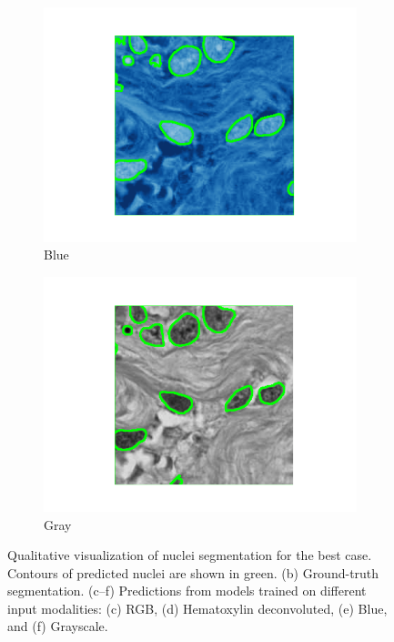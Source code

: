 \documentclass[target=bach,aauheader=,style=]{thud}
\begin{document}
\begin{figure}[!htbp]
\begin{subfigure}{0.48\textwidth}
  \centering
  \includegraphics[width=\linewidth]{imgs/qualitative/best/Blu/contour_img.png}
  \caption{Blue}
\end{subfigure}\hfill
\begin{subfigure}{0.48\textwidth}
  \centering
  \includegraphics[width=\linewidth]{imgs/qualitative/best/Gray/contour_img.png}
  \caption{Gray}
\end{subfigure}

\caption{Qualitative visualization of nuclei segmentation for the best case. 
Contours of predicted nuclei are shown in green. 
(b) Ground-truth segmentation. 
(c--f) Predictions from models trained on different input modalities: (c) RGB, (d) Hematoxylin deconvoluted, (e) Blue, and (f) Grayscale.}
\label{fig:qual_best}
\end{figure}
\end{document}

